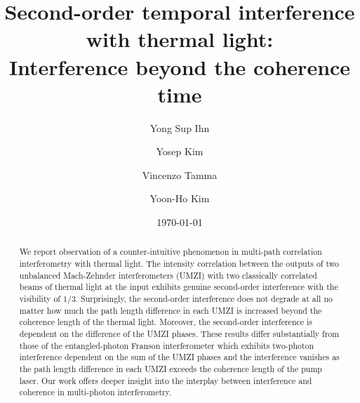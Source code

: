 \documentclass[aps,prl,reprint,showpacs,superscriptaddress]{revtex4-1}
\begin{document}
\title{Second-order temporal interference with thermal light: \\Interference beyond the coherence time}


\author{Yong Sup Ihn}

\author{Yosep Kim}

\author{Vincenzo Tamma}


\author{Yoon-Ho Kim}
\date{\today}

\begin{abstract}
We report observation of a counter-intuitive phenomenon in multi-path correlation interferometry with thermal light. The intensity correlation between the outputs of two unbalanced Mach-Zehnder interferometers (UMZI) with two classically correlated beams of thermal light at the input  exhibits genuine second-order interference with the visibility of $1/3$. Surprisingly, the second-order interference does not degrade at all no matter how much the  path length difference in each UMZI is increased beyond the coherence length of the thermal light. Moreover, the second-order interference is dependent on the difference of the UMZI phases. These results differ substantially from those of the entangled-photon Franson interferometer which exhibits  two-photon interference dependent on the sum of the UMZI phases and the interference vanishes as the path  length difference in each UMZI exceeds the coherence length of the pump laser.  Our work offers deeper insight into the interplay between interference and coherence in multi-photon interferometry.
\end{abstract}
\end{document}
